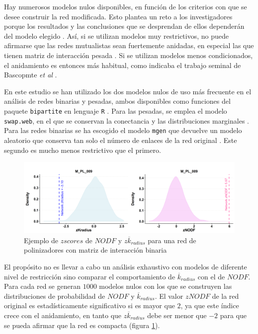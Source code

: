 Hay numerosos modelos nulos disponibles, en función de los criterios con que se desee construir la red modificada. Esto plantea un reto a los investigadores porque los resultados y las conclusiones que se desprendan de ellos dependerán del modelo elegido \cite{ulrich2007null,gotelli2012statistical}. Así, si se utilizan modelos muy restrictivos, no puede afirmarse que las redes mutualistas sean fuertemente anidadas, en especial las que tienen matriz de interacción pesada \cite{joppa2010nestedness, staniczenko2013ghost}. Si se utilizan modelos menos condicionados, el anidamiento es entonces más habitual, como indicaba el trabajo seminal de Bascopmte \textit{et al} \cite{bascompte2003nested}.

En este estudio se han utilizado los dos modelos nulos de uso más frecuente en el análisis de redes binarias y pesadas, ambos disponibles como funciones del paquete \texttt{bipartite} en lenguaje \texttt{R} \cite{dormann2008introducing}. Para las pesadas, se emplea el modelo \texttt{swap.web}, en el que se conservan la conectancia y las distribuciones marginales \cite{ dormann2009indices}. Para las redes binarias se ha escogido el modelo \texttt{mgen} que devuelve un modelo aleatorio que conserva tan solo el número de enlaces de la red original \cite{vazquez2009evaluating}. Este segundo es mucho menos restrictivo que el primero.

\begin{figure}[hp!]
\centering
\includegraphics[scale=0.5]{Figures/ESTATICA_zALL.png}
\caption{Ejemplo de $z scores$ de $NODF$ y $z\overline k_{radius}$ para una red de polinizadores con matriz de interacción binaria \cite{elberling1999structure} }
\label{fig:ESTATICA_zALL}
\end{figure}

El propósito no es llevar a cabo un análisis exhaustivo con modelos de diferente nivel de restricción sino comparar el comportamiento de $\overline k_{radius}$ con el de $NODF$. Para
cada red se generan $1000$ modelos nulos con los que se construyen las distribuciones de probabilidad de $NODF$ y $\overline k_{radius}$. El valor $zNODF$ de la red original es estadísticamente significativo si es mayor que $2$, ya que este índice crece con el anidamiento, en tanto que $z\overline k_{radius}$ debe ser menor que $-2$ para que se pueda afirmar que la red es compacta (figura \ref{fig:ESTATICA_zALL}).

